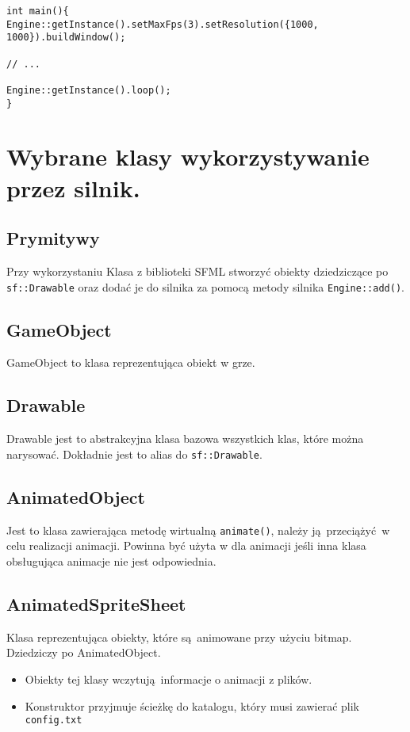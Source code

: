 \documentclass[11pt]{article}
\begin{document}
\begin{verbatim}
int main(){
Engine::getInstance().setMaxFps(3).setResolution({1000, 1000}).buildWindow();

// ...

Engine::getInstance().loop();
}
\end{verbatim}
\section{Wybrane klasy wykorzystywanie przez silnik.}
\label{sec:org8847283}
\subsection{Prymitywy}
\label{sec:orgacdf54f}
Przy wykorzystaniu Klasa z biblioteki SFML stworzyć obiekty dziedziczące po \texttt{sf::Drawable} oraz dodać je do silnika za pomocą metody silnika \texttt{Engine::add()}.
\subsection{GameObject}
\label{sec:orgbbacc67}
GameObject to klasa reprezentująca obiekt w grze.
\subsection{Drawable}
\label{sec:orgbfbd0f7}
Drawable jest to abstrakcyjna klasa bazowa wszystkich klas, które można narysować.
Dokładnie jest to alias do \texttt{sf::Drawable}.
\subsection{AnimatedObject}
\label{sec:org0d80b3e}
Jest to klasa zawierająca metodę wirtualną \texttt{animate()}, należy ją przeciążyć w celu realizacji animacji.
Powinna być użyta w dla animacji jeśli inna klasa obsługująca animacje nie jest odpowiednia.
\subsection{AnimatedSpriteSheet}
\label{sec:orgcc1f4b2}
Klasa reprezentująca obiekty, które są animowane przy użyciu bitmap. Dziedziczy po AnimatedObject.

\begin{itemize}
\item Obiekty tej klasy wczytują informacje o animacji z plików.

\item Konstruktor przyjmuje ścieżkę do katalogu, który musi zawierać plik \texttt{config.txt}
\end{itemize}
\end{document}

